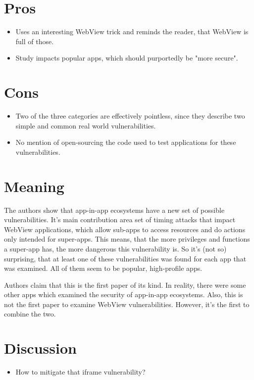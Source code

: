 \documentclass{article}
\begin{document}
\section{Pros}

\begin{itemize}
	\item Uses an interesting WebView trick and reminds the reader, that WebView is full of those.
	\item Study impacts popular apps, which should purportedly be "more secure". 
\end{itemize}

\section{Cons}

\begin{itemize}
	\item Two of the three categories are effectively pointless, since they describe two simple and common real world vulnerabilities.
	\item No mention of open-sourcing the code used to test applications for these vulnerabilities.
\end{itemize}

\section{Meaning}

The authors show that app-in-app ecosystems have a new set of possible vulnerabilities. It's main contribution area set of timing attacks that impact WebView applications, which allow sub-apps to access resources and do actions only intended for super-apps. This means, that the more privileges and functions a super-app has, the more dangerous this vulnerability is. 
So it's (not so) surprising, that at least one of these vulnerabilities was found for each app that was examined. All of them seem to be popular, high-profile apps.

Authors claim that this is the first paper of its kind. In reality, there were some other apps which examined the security of app-in-app ecosystems. Also, this is not the first paper to examine WebView vulnerabilities. However, it's the first to combine the two.


\section{Discussion}

\begin{itemize}
	\item How to mitigate that iframe vulnerability?
\end{itemize}
\end{document}
